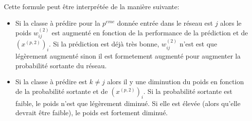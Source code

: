 \documentclass[a4paper,11pt,oneside,roman]{article}
\begin{document}
    Cette formule peut être interprétée de la manière suivante:
    \begin{itemize}
        \item Si la classe à prédire pour la $p^{eme}$ donnée entrée dans le réseau est $j$ alors le poids $w_{ij}^{(2)}$ est augmenté en fonction de la performance de la prédiction et de $(x^{(p,2)})_{i}$.
        Si la prédiction est déjà très bonne, $w_{ij}^{(2)}$ n'est est que légèrement augmenté sinon il est formetement augmenté pour augmenter la probabilité sortante du réseau.
        \item Si la classe à prédire est $k \ne j$ alors il y une diminution du poids en fonction de la probabilité sortante et de $(x^{(p,2)})_{i}$. Si la probabilité sortante est faible, le poids n'est que légèrement diminué. Si elle est élevée (alors qu'elle devrait être faible), le poids est fortement diminué.
    \end{itemize}


    
\end{document}
